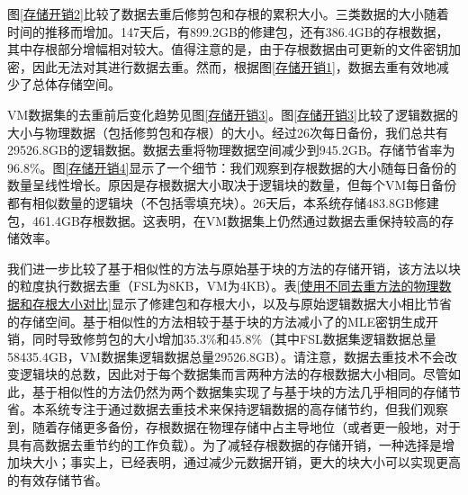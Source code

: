 \documentclass[promaster]{thesis-uestc}
\begin{document}
图\ref{存储开销2}比较了数据去重后修剪包和存根的累积大小。三类数据的大小随着时间的推移而增加。147天后，有899.2GB的修建包，还有386.4GB的存根数据，其中存根部分增幅相对较大。值得注意的是，由于存根数据由可更新的文件密钥加密，因此无法对其进行数据去重。然而，根据图\ref{存储开销1}，数据去重有效地减少了总体存储空间。

VM数据集的去重前后变化趋势见图\ref{存储开销3}。图\ref{存储开销3}比较了逻辑数据的大小与物理数据（包括修剪包和存根）的大小。经过26次每日备份，我们总共有29526.8GB的逻辑数据。数据去重将物理数据空间减少到945.2GB。存储节省率为96.8\%。图\ref{存储开销4}显示了一个细节：我们观察到存根数据的大小随每日备份的数量呈线性增长。原因是存根数据大小取决于逻辑块的数量，但每个VM每日备份都有相似数量的逻辑块（不包括零填充块）。26天后，本系统存储483.8GB修建包，461.4GB存根数据。这表明，在VM数据集上仍然通过数据去重保持较高的存储效率。

我们进一步比较了基于相似性的方法与原始基于块的方法的存储开销，该方法以块的粒度执行数据去重（FSL为8KB，VM为4KB）。表\ref{使用不同去重方法的物理数据和存根大小对比}显示了修建包和存根大小，以及与原始逻辑数据大小相比节省的存储空间。基于相似性的方法相较于基于块的方法减小了的MLE密钥生成开销，同时导致修剪包的大小增加35.3\%和45.8\%（其中FSL数据集逻辑数据总量58435.4GB，VM数据集逻辑数据总量29526.8GB）。请注意，数据去重技术不会改变逻辑块的总数，因此对于每个数据集而言两种方法的存根数据大小相同。尽管如此，基于相似性的方法仍然为两个数据集实现了与基于块的方法几乎相同的存储节省。本系统专注于通过数据去重技术来保持逻辑数据的高存储节约，但我们观察到，随着存储更多备份，存根数据在物理存储中占主导地位（或者更一般地，对于具有高数据去重节约的工作负载）。为了减轻存根数据的存储开销，一种选择是增加块大小；事实上，已经表明，通过减少元数据开销，更大的块大小可以实现更高的有效存储节省。
\end{document}
